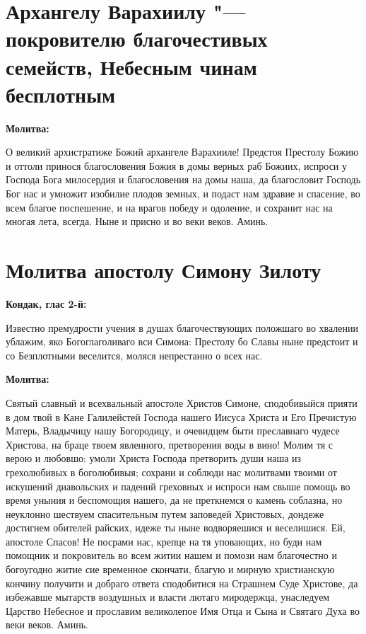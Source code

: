 {\bigskip\bigskip\noparindent\begin{minipage}{\textwidth}
\section{Архангелу Варахиилу "--- покровителю благочестивых семейств, Небесным чинам бесплотным}

\restoreparindent\bfseries Молитва:\normalfont{}\par

О великий архистратиже Божий архангеле Варахииле! Предстоя Престолу Божию и оттоли принося благословения Божия в домы верных раб Божиих, испроси у Господа Бога милосердия и благословения на домы наша, да благословит Господь Бог нас и умножит изобилие плодов земных, и подаст нам здравие и спасение, во всем благое поспешение, и на врагов победу и одоление, и сохранит нас на многая лета, всегда. Ныне и присно и во веки веков. Аминь.
\end{minipage}}

\shortpage{}

\section{Молитва апостолу Симону Зилоту}
 
\bfseries Кондак, глас 2-й:\normalfont{}


Известно премудрости учения в душах благочествующих положшаго во хвалении ублажим, яко Богоглаголиваго вси Симона: Престолу бо Славы ныне предстоит и со Безплотными веселится, моляся непрестанно о всех нас.


\medskip
\bfseries Молитва:\normalfont{}\nopagebreak


Святый славный и всехвальный апостоле Христов Симоне, сподобивыйся прияти в дом твой в Кане Галилейстей Господа нашего Иисуса Христа и Его Пречистую Матерь, Владычицу нашу Богородицу, и очевидцем быти преславнаго чудесе Христова, на браце твоем явленного, претворения воды в вино! Молим тя с верою и любовшо: умоли Христа Господа претворить души наша из грехолюбивых в боголюбивыя; сохрани и соблюди нас молитвами твоими от искушений диавольских и падений греховных и испроси нам свыше помощь во время уныния и беспомощия нашего, да не преткнемся о камень соблазна, но неуклонно шествуем спасительным путем заповедей Христовых, дондеже достигнем обителей райских, идеже ты ныне водворяешися и веселишися. Ей, апостоле Спасов! Не посрами нас, крепце на тя уповающих, но буди нам помощник и покровитель во всем житии нашем и помози нам благочестно и богоугодно житие сие временное скончати, благую и мирную христианскую кончину получити и добраго ответа сподобитися на Страшнем Суде Христове, да избежавше мытарств воздушных и власти лютаго миродержца, унаследуем Царство Небесное и прославим великолепое Имя Отца и Сына и Святаго Духа во веки веков. Аминь.\mychapterending

